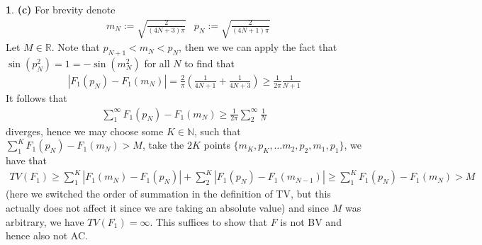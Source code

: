 \documentclass[10.5pt]{article}
\theoremstyle{definition}
\newtheorem{pb}{}
\newcommand{\set}[1]{\{#1\}}
\newcommand{\abs}[1]{\left\vert#1\right\vert}
\begin{document}
\begin{pb}
        \textbf{(c)} For brevity denote
        \begin{align*}
            &m_N := \sqrt{\frac{2}{(4N+3)\pi}} &p_N := \sqrt{\frac{2}{(4N+1)\pi}}
        \end{align*}
        Let \(M \in \mathbb{R}\). Note that \(p_{N+1} < m_N < p_N\), then we we can apply the fact that \(\sin(p_N^2) = 1 = -\sin(m_N^2)\) for all \(N\) to find that
        \begin{align*}
            \abs{F_1(p_N) - F_1(m_N)} = \frac{2}{\pi}\left(\frac{1}{4N+1} + \frac{1}{4N+3}\right)
            \geq \frac{1}{2\pi}\frac{1}{N+1} 
        \end{align*}
        It follows that
        \begin{align*}
            \sum_1^\infty F_1(p_N) - F_1(m_N) \geq \frac{1}{2\pi}\sum_{2}^\infty\frac{1}{N}
        \end{align*}
        diverges, hence we may choose some \(K \in \mathbb{N}\), such that \(\sum_1^K F_1(p_N) - F_1(m_N) > M\), take the \(2K\) points \(\set{m_{K}, p_{K}, \hdots m_2, p_2, m_1, p_1}\), we have that
        \begin{align*}
            TV(F_1) \geq \sum_1^{K}  \abs{F_1(m_N) - F_1(p_N)} + \sum_2^K \abs{F_1(p_N) - F_1(m_{N-1})} \geq \sum_1^K F_1(p_N) - F_1(m_N) > M
        \end{align*}
        (here we switched the order of summation in the definition of TV, but this actually does not affect it since we are taking an absolute value) and since \(M\) was arbitrary, we have \(TV(F_1) = \infty\). This suffices to show that \(F\) is not BV and hence also not AC.
    \end{pb}
\end{document}
